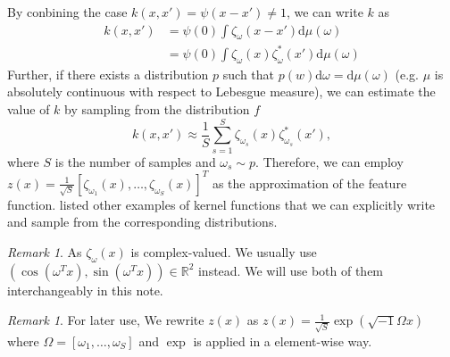 \documentclass{amsart}
\theoremstyle{definition}
\theoremstyle{remark}
\newtheorem{remark}[theorem]{Remark}
\numberwithin{equation}{section}
\begin{document}
By conbining the case $k(x, x')=\psi(x-x')\not = 1$, we can write $k$ as
\begin{equation}
\begin{split}
k(x, x') &= \psi(0) \int \zeta_\omega(x-x') \mathrm{d}\mu(\omega)\\
         &= \psi(0) \int \zeta_\omega(x) \zeta_\omega^{\ast}(x') \mathrm{d}\mu(\omega)
\end{split}
\end{equation}
Further, if there exists a distribution $p$ such that $p(w)\mathrm{d}\omega = \mathrm{d}\mu(\omega)$
(e.g. $\mu$ is absolutely continuous with respect to Lebesgue measure),
we can estimate the value of $k$ by sampling from the distribution $f$
\begin{equation}
k(x, x') \approx \frac{1}{S} \sum_{s=1}^S \zeta_{\omega_s}(x) \zeta_{\omega_s}^{\ast}(x'),
\end{equation}
where $S$ is the number of samples and $\omega_s \sim p$.
Therefore, we can employ $z(x) =
\frac{1}{\sqrt{S}} \left[ \zeta_{\omega_{1}}(x), \ldots, \zeta_{\omega_{S}}(x) \right]^T$ as the approximation of the feature function.
\cite{dai2014scalable} listed other examples of kernel functions that we can explicitly write and sample from the corresponding distributions.

\begin{remark}
As $\zeta_{\omega}(x)$ is complex-valued. We usually use $(\cos(\omega^Tx), \sin(\omega^Tx))\in \mathbb{R}^2$ instead.
We will use both of them interchangeably in this note.
\end{remark}

\begin{remark}
For later use, We rewrite $z(x)$ as $z(x) = \frac{1}{\sqrt{S}}\exp(\sqrt{-1}\Omega x)$ where $\Omega = [\omega_{1}, \ldots, \omega_{S}]$ and $\exp$ is applied in a element-wise way.
\end{remark}
\end{document}
